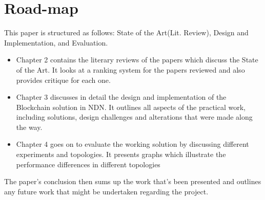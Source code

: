 \section{Road-map}

This paper is structured as follows: State of the Art(Lit. Review), Design and Implementation, and Evaluation.
\begin{itemize}
\item Chapter 2 contains the literary reviews of the papers which discuss the State of the Art. It looks at a ranking system for the papers reviewed and also provides critique for each one. 

\item Chapter 3 discusses in detail the design and implementation of the Blockchain solution in NDN. It outlines all aspects of the practical work, including solutions, design challenges and alterations that were made along the way.

\item Chapter 4 goes on to evaluate the working solution by discussing different experiments and topologies. It presents graphs which illustrate the performance differences in different topologies
\end{itemize}
The paper's conclusion then sums up the work that's been presented and outlines any future work that might be undertaken regarding the project.